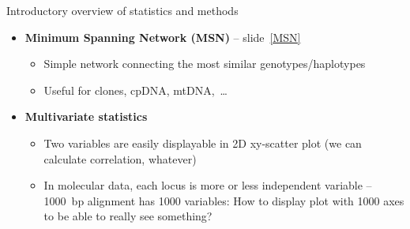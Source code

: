 \documentclass[compress, ucs, xelatex, 11pt, xcolor=svgnames,
  hyperref={
    bookmarks=true,
    unicode=true,
    colorlinks=true,
    pdftitle={Molecular data in R},
    plainpages=false,
    pdfauthor={Vojtech Zeisek},
    pdfsubject={Course about phylogeny and evolution in R},
    pdfcreator={XeLaTeX},
    pdfkeywords={R, evolution, phylogeny, molecular data},
    linkcolor=Tomato,
    anchorcolor=SaddleBrown,
    citecolor=Goldenrod,
    filecolor=DarkMagenta,
    menucolor=Sienna,
    urlcolor=DarkTurquoise,
    pdftex},
  url={hyphens, lowtilde} %
  ]{beamer}
\begin{document}
\begin{frame}[allowframebreaks]{Introductory overview of statistics and methods}
\begin{itemize}
\begin{itemize}
      \item \textbf{Hierarchical clustering} -- from slide~\ref{hierclust}
      \begin{itemize}
	\item Several methods clustering individuals according to their (dis)similarity from top or down into clusters
	\item (Un)weighted per-group mean average (\textbf{U/WPGMA}) and others
	\item Used more in ecology, in genetic data not so much anymore (following methods use to produce better results)
      \end{itemize}
      \item \textbf{Neighbor-Joining (NJ)} -- from slide~\ref{NJ}
      \begin{itemize}
	\item A tree starting from the two most similar individuals and connecting in the next steps next and next the most similar individual
	\item In some cases artificially chains individuals
	\item Several methods try to improve it -- slide~\ref{NJ-replacement}
      \end{itemize}
      \item \textbf{Principal Coordinates Analysis (PCoA)} -- from slide~\ref{pcoa}
      \begin{itemize}
	\item The most common method of multivariate statistics for genetic data
	\item Shows individuals in 2D scatter plot to retain maximum variability (by finding correlations among loci)
      \end{itemize}
    \end{itemize}
    \item \textbf{Minimum Spanning Network (MSN)} -- slide~\ref{MSN}
    \begin{itemize}
      \item Simple network connecting the most similar genotypes/haplotypes
      \item Useful for clones, cpDNA, mtDNA,~\ldots
      \end{itemize}
    \item \textbf{Multivariate statistics}
    \begin{itemize}
      \item Two variables are easily displayable in 2D xy-scatter plot (we can calculate correlation, whatever)
      \item In molecular data, each locus is more or less independent variable -- 1000~bp alignment has 1000 variables: How to display plot with 1000 axes to be able to really see something?

\end{itemize}
\end{itemize}
\end{frame}
\end{document}
